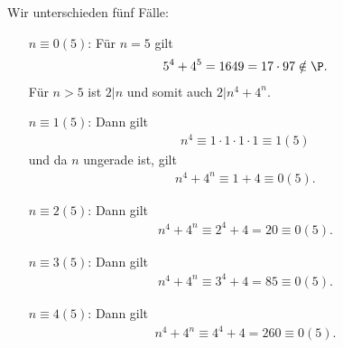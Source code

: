 \begin{solution}
\begin{enumerate}
  Wir unterschieden fünf Fälle:
  \begin{itemize}
    \item[$n \equiv 0 (5)$:] Für $n = 5$ gilt
     \begin{align*}
       5^4 + 4^5 = 1649 = 17\cdot97 \notin \P.
     \end{align*}
     Für $n > 5$ ist $2|n$ und somit auch $2|n^4 + 4^n$.
    \item[$n \equiv 1 (5)$:] Dann gilt
     \begin{align*}
       n^4 \equiv 1\cdot1\cdot1\cdot1 \equiv 1 (5)
     \end{align*}
     und da $n$ ungerade ist, gilt
     \begin{align*}
       n^4 + 4^n \equiv 1 + 4 \equiv 0 (5).
     \end{align*}
  \item[$n \equiv 2 (5)$:] Dann gilt
    \begin{align*}
      n^4 + 4^n \equiv 2^4 + 4 = 20 \equiv 0 (5).
    \end{align*}
  \item[$n \equiv 3 (5)$:] Dann gilt
    \begin{align*}
      n^4 + 4^n \equiv 3^4 + 4 = 85 \equiv 0 (5).
    \end{align*}
  \item[$n \equiv 4(5)$:] Dann gilt
    \begin{align*}
      n^4 + 4^n \equiv 4^4 + 4 = 260 \equiv 0 (5).
    \end{align*}

  \end{itemize}

\end{enumerate}


\end{solution}


